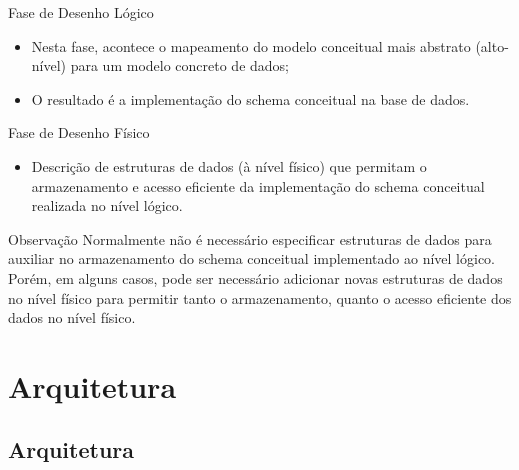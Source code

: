 \documentclass[xcolor=x11names,compress]{beamer}
\begin{document}
\begin{frame}{Fase de Desenho Lógico}

\begin{itemize}
\itemsep 5mm

\item Nesta fase, acontece o mapeamento do modelo conceitual mais abstrato (alto-nível) para um modelo concreto de dados;

\item O resultado é a implementação do schema conceitual na base de dados.

\end{itemize}

\end{frame}

\begin{frame}{Fase de Desenho Físico}

\begin{itemize}
\itemsep 5mm

\item Descrição de estruturas de dados (à nível físico) que permitam o armazenamento e acesso eficiente da implementação do schema conceitual realizada no nível lógico.

\end{itemize}

\begin{alertblock}{\centering Observação}
Normalmente não é necessário especificar estruturas de dados para auxiliar no armazenamento do schema conceitual implementado ao nível lógico. Porém, em alguns casos, pode ser necessário adicionar novas estruturas de dados no nível físico para permitir tanto o armazenamento, quanto o acesso eficiente dos dados no nível físico. 
\end{alertblock}

\end{frame}

\section{Arquitetura}
\subsection{Arquitetura}
\end{document}
